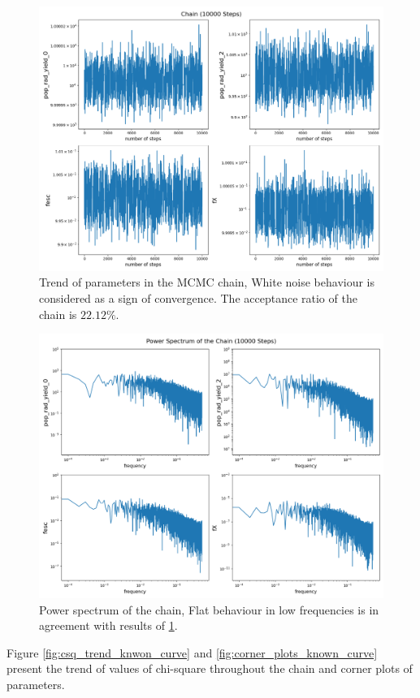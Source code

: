 \documentclass[12pt, TexShade, letterpaper]{report}
\begin{document}
\begin{figure}[h!]
\centering
\includegraphics[scale =0.5]{chain_known_curve.png}
\caption[Trend of parameters]{Trend of parameters in the MCMC chain, White noise behaviour is considered as a sign of convergence. The acceptance ratio of the chain is $22.12\%.$}
\label{fig:chain_known_curve}
\end{figure}

\begin{figure}[h!]
\centering
\includegraphics[scale =0.5]{power_spectrum_known_curve.png}
\caption[Power spectrum of the chain]{Power spectrum of the chain, Flat behaviour in low frequencies is in agreement with results of \ref{fig:chain_known_curve}.}
\label{fig:power_spectrum_known_curve}
\end{figure}
Figure \ref{fig:csq_trend_knwon_curve} and \ref{fig:corner_plots_known_curve} present the trend of values of chi-square throughout the chain and corner plots of parameters.\par
\end{document}
